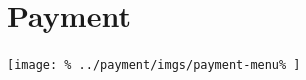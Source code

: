 \documentclass[../main/main]{subfiles}
\begin{document}
\newpage
\chapter{Payment}
\texttt{[image: \%
  ../payment/imgs/payment-menu\%
]}
\end{document}
